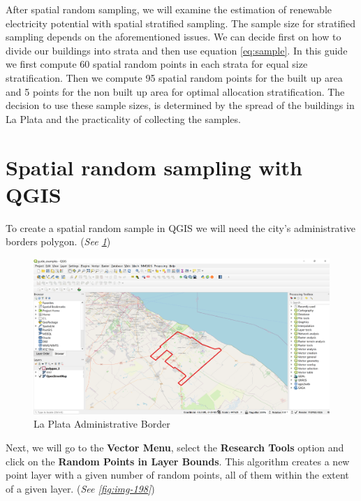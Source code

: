 \documentclass[
]{book}
\begin{document}
After spatial random sampling, we will examine the estimation of renewable electricity potential with spatial stratified sampling. The sample size for stratified sampling depends on the aforementioned issues. We can decide first on how to divide our buildings into strata and then use equation \eqref{eq:sample}.
In this guide we first compute 60 spatial random points in each strata for equal size stratification. Then we compute 95 spatial random points for the built up area and 5 points for the non built up area for optimal allocation stratification.
The decision to use these sample sizes, is determined by the spread of the buildings in La Plata and the practicality of collecting the samples.

\hypertarget{spatial-random-sampling-with-qgis}{%
\section{Spatial random sampling with QGIS}\label{spatial-random-sampling-with-qgis}}

To create a spatial random sample in QGIS we will need the city's administrative borders polygon. (\emph{See \ref{fig:img-197}})

\begin{figure}

{\centering \includegraphics[width=1\linewidth]{images/admin} 

}

\caption{La Plata Administrative Border}\label{fig:img-197}
\end{figure}

Next, we will go to the \textbf{Vector Menu}, select the \textbf{Research Tools} option and click on the \textbf{Random Points in Layer Bounds}. This algorithm creates a new point layer with a given number of random points, all of them within the extent of a given layer. (\emph{See \ref{fig:img-198}})
\end{document}

